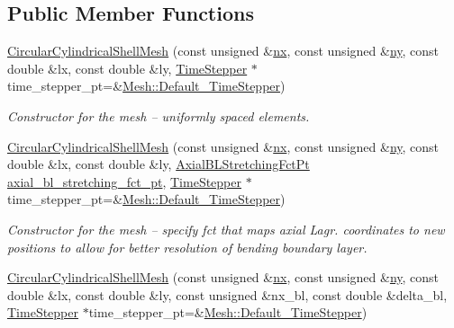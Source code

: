 \subsection*{Public Member Functions}
\begin{DoxyCompactItemize}
\item 
\hyperlink{classoomph_1_1CircularCylindricalShellMesh_ad392c085b9a8f87fd9a24e02738f5d60}{Circular\+Cylindrical\+Shell\+Mesh} (const unsigned \&\hyperlink{classoomph_1_1RectangularQuadMesh_abfef93d6322886cdce14a437186e4821}{nx}, const unsigned \&\hyperlink{classoomph_1_1RectangularQuadMesh_a86d76a55eb7c4e8bca9b74d23c8b0412}{ny}, const double \&lx, const double \&ly, \hyperlink{classoomph_1_1TimeStepper}{Time\+Stepper} $\ast$time\+\_\+stepper\+\_\+pt=\&\hyperlink{classoomph_1_1Mesh_a12243d0fee2b1fcee729ee5a4777ea10}{Mesh\+::\+Default\+\_\+\+Time\+Stepper})
\begin{DoxyCompactList}\small\item\em Constructor for the mesh -- uniformly spaced elements. \end{DoxyCompactList}\item 
\hyperlink{classoomph_1_1CircularCylindricalShellMesh_a2382a9ed0cd210c7b697e6ba4f4e2b0b}{Circular\+Cylindrical\+Shell\+Mesh} (const unsigned \&\hyperlink{classoomph_1_1RectangularQuadMesh_abfef93d6322886cdce14a437186e4821}{nx}, const unsigned \&\hyperlink{classoomph_1_1RectangularQuadMesh_a86d76a55eb7c4e8bca9b74d23c8b0412}{ny}, const double \&lx, const double \&ly, \hyperlink{classoomph_1_1CircularCylindricalShellMesh_a770336fa72e8911f31b9fe3f70197a51}{Axial\+B\+L\+Stretching\+Fct\+Pt} \hyperlink{classoomph_1_1CircularCylindricalShellMesh_aa9c69dc3c6692d19706178d558d07f86}{axial\+\_\+bl\+\_\+stretching\+\_\+fct\+\_\+pt}, \hyperlink{classoomph_1_1TimeStepper}{Time\+Stepper} $\ast$time\+\_\+stepper\+\_\+pt=\&\hyperlink{classoomph_1_1Mesh_a12243d0fee2b1fcee729ee5a4777ea10}{Mesh\+::\+Default\+\_\+\+Time\+Stepper})
\begin{DoxyCompactList}\small\item\em Constructor for the mesh -- specify fct that maps axial Lagr. coordinates to new positions to allow for better resolution of bending boundary layer. \end{DoxyCompactList}\item 
\hyperlink{classoomph_1_1CircularCylindricalShellMesh_aba83d68289f90a8567887443c3b9c6f0}{Circular\+Cylindrical\+Shell\+Mesh} (const unsigned \&\hyperlink{classoomph_1_1RectangularQuadMesh_abfef93d6322886cdce14a437186e4821}{nx}, const unsigned \&\hyperlink{classoomph_1_1RectangularQuadMesh_a86d76a55eb7c4e8bca9b74d23c8b0412}{ny}, const double \&lx, const double \&ly, const unsigned \&nx\+\_\+bl, const double \&delta\+\_\+bl, \hyperlink{classoomph_1_1TimeStepper}{Time\+Stepper} $\ast$time\+\_\+stepper\+\_\+pt=\&\hyperlink{classoomph_1_1Mesh_a12243d0fee2b1fcee729ee5a4777ea10}{Mesh\+::\+Default\+\_\+\+Time\+Stepper})

\end{DoxyCompactItemize}
